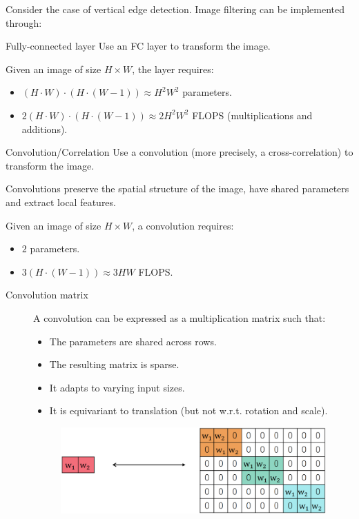 Consider the case of vertical edge detection.
Image filtering can be implemented through:
\begin{descriptionlist}
    \item[Fully-connected layer] 
        Use an FC layer to transform the image.

        Given an image of size $H \times W$, the layer requires:
        \begin{itemize}
            \item $(H \cdot W) \cdot (H \cdot (W-1)) \approx H^2W^2$ parameters.
            \item $2 (H \cdot W) \cdot (H \cdot (W-1)) \approx 2H^2W^2$ FLOPS (multiplications and additions).
        \end{itemize}

    \item[Convolution/Correlation] 
        Use a convolution (more precisely, a cross-correlation) to transform the image.

        \begin{remark}
            Convolutions preserve the spatial structure of the image, have shared parameters and extract local features.
        \end{remark}

        Given an image of size $H \times W$, a convolution requires:
        \begin{itemize}
            \item $2$ parameters.
            \item $3 (H \cdot (W-1)) \approx 3HW$ FLOPS.
        \end{itemize}

        \begin{description}
            \item[Convolution matrix] 
                A convolution can be expressed as a multiplication matrix such that:
                \begin{itemize}
                    \item The parameters are shared across rows.
                    \item The resulting matrix is sparse.
                    \item It adapts to varying input sizes.
                    \item It is equivariant to translation (but not w.r.t. rotation and scale).
                \end{itemize}

                \begin{figure}[H]
                    \centering
                    \includegraphics[width=0.5\linewidth]{./img/convolution_matrix.png}
                \end{figure}
        \end{description}
\end{descriptionlist}
